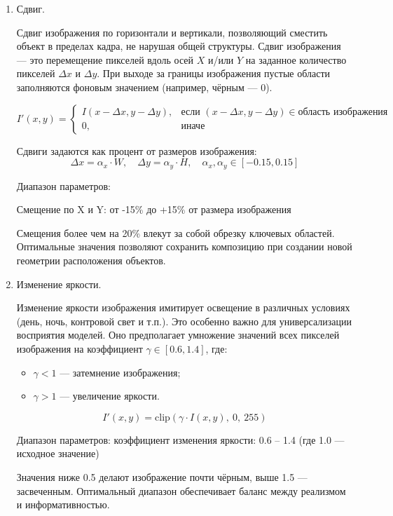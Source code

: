\begin{enumerate}

	\item Сдвиг.

Сдвиг изображения по горизонтали и вертикали, позволяющий сместить объект в пределах кадра, не нарушая общей структуры. 
Сдвиг изображения — это перемещение пикселей вдоль осей $X$ и/или $Y$ на заданное количество пикселей $\Delta x$ и $\Delta y$. При выходе за границы изображения пустые области заполняются фоновым значением (например, чёрным — 0).

\[
I'(x, y) =
\begin{cases}
	I(x - \Delta x, y - \Delta y), & \text{если } (x - \Delta x, y - \Delta y) \in \text{область изображения} \\
	0, & \text{иначе}
\end{cases}
\]

Сдвиги задаются как процент от размеров изображения:
\[
\Delta x = \alpha_x \cdot W,\quad \Delta y = \alpha_y \cdot H,\quad \alpha_x, \alpha_y \in [-0.15, 0.15]
\]

Диапазон параметров:

Смещение по X и Y: от -15\% до +15\% от размера изображения

Смещения более чем на 20\% влекут за собой обрезку ключевых областей. Оптимальные значения позволяют сохранить композицию при создании новой геометрии расположения объектов.



	\item Изменение яркости.

Изменение яркости изображения имитирует освещение в различных условиях (день, ночь, контровой свет и т.п.). Это особенно важно для универсализации восприятия моделей. Оно предполагает умножение значений всех пикселей изображения на коэффициент $\gamma \in [0.6, 1.4]$, где:

\begin{itemize}
	\item $\gamma < 1$ — затемнение изображения;
	\item $\gamma > 1$ — увеличение яркости.
\end{itemize}

\[
I'(x, y) = \text{clip}\left( \gamma \cdot I(x, y),\ 0,\ 255 \right)
\]

Диапазон параметров: коэффициент изменения яркости: 0.6 – 1.4
(где 1.0 — исходное значение)

Значения ниже 0.5 делают изображение почти чёрным, выше 1.5 — засвеченным. Оптимальный диапазон обеспечивает баланс между реализмом и информативностью.


\end{enumerate}

